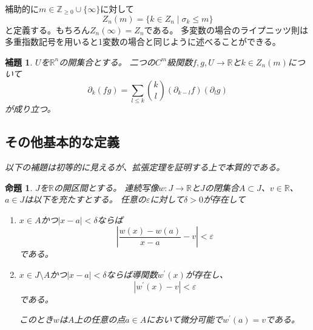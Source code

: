 \documentclass[leqno]{jsarticle}
\newtheorem{prop}[thm]{命題}
\newtheorem{lem}[thm]{補題}
\newcommand{\zz}{\mathbb{Z}}
\newcommand{\rr}{\mathbb{R}}
\newcommand{\ep}{\varepsilon}
\begin{document}
補助的に$m\in \zz_{\ge 0}\cup \{\infty\}$に対して
\[
Z_n(m)=\{k\in Z_n\mid \sigma_k\le m\}
\]
と定義する。もちろん$Z_n(\infty)=Z_n$である。
多変数の場合のライプニッツ則は多重指数記号を用いると1変数の場合と同じように述べることができる。
\begin{lem}
$U$を$\rr^n$の開集合とする。
二つの$C^m$級関数$f,g,U\to \rr$と$k\in Z_n(m)$について
\[
\partial_k(fg)=\sum_{l\le k}\binom{k}{l}(\partial_{k-l}f)(\partial_lg)
\]
が成り立つ。
\end{lem}
\subsection{その他基本的な定義}
\emph{以下の補題は初等的に見えるが、拡張定理を証明する上で本質的である。}
\begin{prop}\label{bibun}
$J$を$\rr$の開区間とする。
連続写像$w:J\to \rr$と$J$の閉集合$A\subset J$、$v\in \rr$、$a\in J$は以下を充たすとする。
任意の$\ep$に対して$\delta>0$が存在して
\begin{enumerate}
\item $x\in A$かつ$|x-a|<\delta$ならば
\[
\left|\frac{w(x)-w(a)}{x-a}-v\right|<\ep
\]
である。
\item $x\in J\setminus A$かつ$|x-a|<\delta$ならば導関数$w^{\prime}(x)$が存在し、
\[
|w^{\prime}(x)-v|<\ep
\]
である。
\par
このとき$w$は$A$上の任意の点$a\in A$において微分可能で$w^{\prime}(a)=v$である。
\end{enumerate}
\end{prop}
\end{document}
